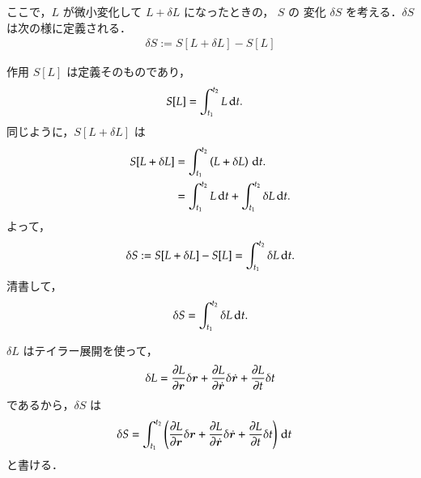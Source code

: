             ここで，$L$ が微小変化して $L+\delta L$ になったときの， $S$ の
            変化 $\delta S$ を考える．$\delta S$ は次の様に定義される．
                                \begin{align}
                        \delta S:=S[L+\delta L]-S[L]
                                \end{align}

                        作用 $S[L]$ は定義そのものであり，
                        \begin{align*}
                                S[L]          &= \int_{t_{1}}^{t_{2}} L \,\mathrm{d} t.
                        \end{align*}
                        同じように，$S[L+\delta L]$ は
                        \begin{align*}
                                S[L+\delta L] &=  \int_{t_{1}}^{t_{2}} \left(L + \delta L\right)\,\mathrm{d} t. \\
                                                                  &=  \int_{t_{1}}^{t_{2}} L \,\mathrm{d} t + \int_{t_{1}}^{t_{2}} \delta L \,\mathrm{d} t.
                        \end{align*}
            よって，
                \begin{align*}
                        \delta S := S[L+\delta L] - S[L] = \int_{t_{1}}^{t_{2}} \delta L \,\mathrm{d} t.
                \end{align*}
                        清書して，
                \begin{align}
                        \delta S = \int_{t_{1}}^{t_{2}} \delta L \,\mathrm{d} t.
                \end{align}

            $\delta L$ はテイラー展開を使って，
                \begin{align}
                    \delta L=\frac{\partial L}{\partial \boldsymbol{r}}\delta \boldsymbol{r}
                            +\frac{\partial L}{\partial \dot{\boldsymbol{r}}}\delta\dot{\boldsymbol{r}}
                            +\frac{\partial L}{\partial t}\delta t
                \end{align}
            であるから，$\delta S$ は
                \begin{align}
                    \delta S&= \int_{t_{1}}^{t_{2}}\left(
                                        \frac{\partial L}{\partial \boldsymbol{r}}\delta \boldsymbol{r}
                                        +\frac{\partial L}{\partial \dot{\boldsymbol{r}}}\delta\dot{\boldsymbol{r}}
                                        +\frac{\partial L}{\partial t}\delta t \right) \,\mathrm{d} t
                \end{align}
            と書ける．

